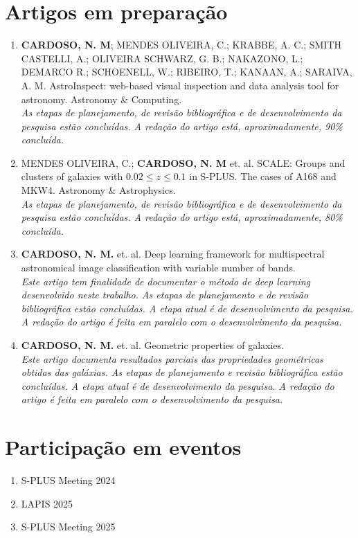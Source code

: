 \section{Artigos em preparação}
\label{sec:artigos-preparacao}
\begin{enumerate}
  \item \textbf{CARDOSO, N. M}; MENDES OLIVEIRA, C.; KRABBE, A. C.; SMITH CASTELLI, A.; OLIVEIRA SCHWARZ, G. B.; NAKAZONO, L.; DEMARCO R.; SCHOENELL, W.; RIBEIRO, T.; KANAAN, A.; SARAIVA, A. M. AstroInspect: web-based visual inspection and data analysis tool for astronomy. Astronomy \& Computing.\\\textit{As etapas de planejamento, de revisão bibliográfica e de desenvolvimento da pesquisa estão concluídas. A redação do artigo está, aproximadamente, 90\% concluída.}
  \item MENDES OLIVEIRA, C.; \textbf{CARDOSO, N. M} et. al. SCALE: Groups and clusters of galaxies with $0.02 \leq z \leq 0.1$ in S-PLUS. The cases of A168 and MKW4. Astronomy \& Astrophysics.\\\textit{As etapas de planejamento, de revisão bibliográfica e de desenvolvimento da pesquisa estão concluídas. A redação do artigo está, aproximadamente, 80\% concluída.}
  \item \textbf{CARDOSO, N. M.} et. al. Deep learning framework for multispectral astronomical image classification with variable number of bands.\\\textit{Este artigo tem finalidade de documentar o método de deep learning desenvolvido neste trabalho. As etapas de planejamento e de revisão bibliográfica estão concluídas. A etapa atual é de desenvolvimento da pesquisa. A redação do artigo é feita em paralelo com o desenvolvimento da pesquisa.}
  \item \textbf{CARDOSO, N. M.} et. al. Geometric properties of galaxies.\\\textit{Este artigo documenta resultados parciais das propriedades geométricas obtidas das galáxias. As etapas de planejamento e revisão bibliográfica estão concluídas. A etapa atual é de desenvolvimento da pesquisa. A redação do artigo é feita em paralelo com o desenvolvimento da pesquisa.}
\end{enumerate}

\section{Participação em eventos}
\label{sec:eventos}
\begin{enumerate}
  \item S-PLUS Meeting 2024
  \item LAPIS 2025
  \item S-PLUS Meeting 2025
\end{enumerate}


